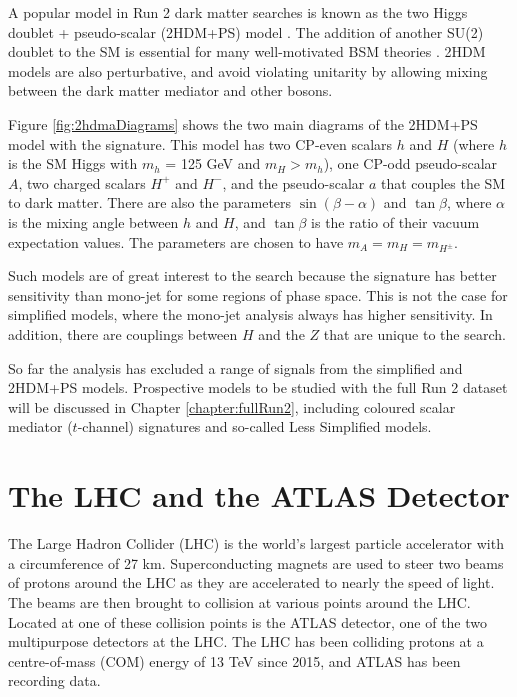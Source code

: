 A popular model in Run 2 \monoX dark matter searches is known as the two Higgs doublet + pseudo-scalar (2HDM+PS) model \cite{Bauer:2017ota}. The addition of another SU(2) doublet to the SM is essential for many well-motivated BSM theories \cite{Branco:2011iw}. 2HDM models are also perturbative, and avoid violating unitarity by allowing mixing between the dark matter mediator and other bosons. 

Figure \ref{fig:2hdmaDiagrams} shows the two main diagrams of the 2HDM+PS model with the \monoZ signature. This model has two CP-even scalars $h$ and $H$ (where $h$ is the SM Higgs with $m_h$ = 125 GeV and $m_H > m_h$), one CP-odd pseudo-scalar $A$, two charged scalars $H^+$ and $H^-$, and the pseudo-scalar $a$ that couples the SM to dark matter. There are also the parameters $\sin(\beta-\alpha)$ and $\tan \beta$, where $\alpha$ is the mixing angle between $h$ and $H$, and $\tan \beta$ is the ratio of their vacuum expectation values. The parameters are chosen to have $m_A = m_H = m_{H^\pm}$.

Such models are of great interest to the \monoZ search because the \monoZ signature has better sensitivity than mono-jet for some regions of phase space. This is not the case for simplified models, where the mono-jet analysis always has higher sensitivity. In addition, there are couplings between $H$ and the $Z$ that are unique to the \monoZ search.

So far the \monoZ analysis has excluded a range of signals from the simplified and 2HDM+PS models. Prospective models to be studied with the full Run 2 dataset will be discussed in Chapter \ref{chapter:fullRun2}, including coloured scalar mediator ($t$-channel) signatures and so-called Less Simplified models.

\clearpage

\section{The LHC and the ATLAS Detector}

The Large Hadron Collider (LHC) is the world's largest particle accelerator with a circumference of 27 km. Superconducting magnets are used to steer two beams of protons around the LHC as they are accelerated to nearly the speed of light. The beams are then brought to collision at various points around the LHC. Located at one of these collision points is the ATLAS detector, one of the two multipurpose detectors at the LHC. The LHC has been colliding protons at a centre-of-mass (COM) energy of 13 TeV since 2015, and ATLAS has been recording data.

